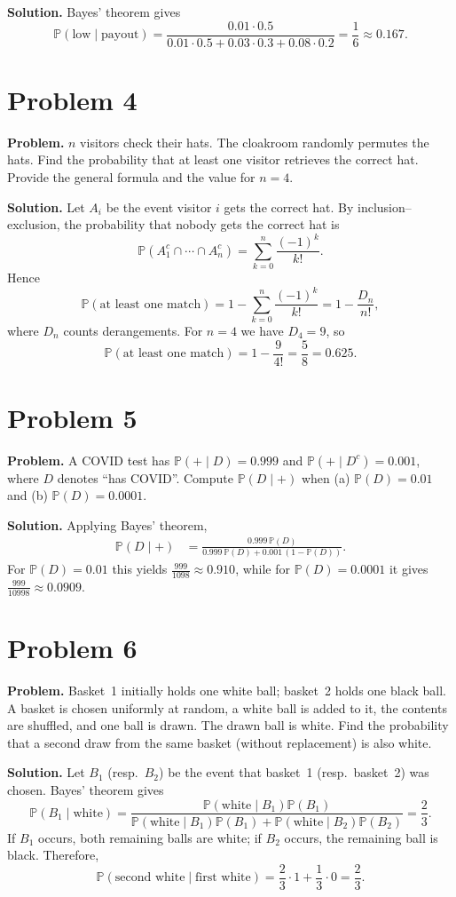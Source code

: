 \documentclass{article}
\begin{document}
\textbf{Solution.} Bayes' theorem gives
\[
\mathbb{P}(\text{low}\mid \text{payout}) = \frac{0.01\cdot 0.5}{0.01\cdot 0.5 + 0.03\cdot 0.3 + 0.08\cdot 0.2} = \frac{1}{6} \approx 0.167.
\]

\section{Problem 4}

\textbf{Problem.} $n$ visitors check their hats. The cloakroom randomly permutes the hats. Find the probability that at least one visitor retrieves the correct hat. Provide the general formula and the value for $n=4$.

\textbf{Solution.} Let $A_i$ be the event visitor $i$ gets the correct hat. By inclusion--exclusion, the probability that nobody gets the correct hat is
\[
\mathbb{P}(A_1^c\cap \cdots \cap A_n^c) = \sum_{k=0}^{n} \frac{(-1)^k}{k!}.
\]
Hence
\[
\mathbb{P}(\text{at least one match}) = 1 - \sum_{k=0}^{n} \frac{(-1)^k}{k!} = 1 - \frac{D_n}{n!},
\]
where $D_n$ counts derangements. For $n=4$ we have $D_4=9$, so
\[
\mathbb{P}(\text{at least one match}) = 1 - \frac{9}{4!} = \frac{5}{8} = 0.625.
\]

\section{Problem 5}

\textbf{Problem.} A COVID test has $\mathbb{P}(+\mid D)=0.999$ and $\mathbb{P}(+\mid D^c)=0.001$, where $D$ denotes ``has COVID''. Compute $\mathbb{P}(D\mid +)$ when (a) $\mathbb{P}(D)=0.01$ and (b) $\mathbb{P}(D)=0.0001$.

\textbf{Solution.} Applying Bayes' theorem,
\begin{align*}
\mathbb{P}(D\mid +) &= \frac{0.999\,\mathbb{P}(D)}{0.999\,\mathbb{P}(D) + 0.001\,(1-\mathbb{P}(D))}.
\end{align*}
For $\mathbb{P}(D)=0.01$ this yields $\frac{999}{1098}\approx 0.910$, while for $\mathbb{P}(D)=0.0001$ it gives $\frac{999}{10998}\approx 0.0909$.

\section{Problem 6}

\textbf{Problem.} Basket~1 initially holds one white ball; basket~2 holds one black ball. A basket is chosen uniformly at random, a white ball is added to it, the contents are shuffled, and one ball is drawn. The drawn ball is white. Find the probability that a second draw from the same basket (without replacement) is also white.

\textbf{Solution.} Let $B_1$ (resp.\ $B_2$) be the event that basket~1 (resp.\ basket~2) was chosen. Bayes' theorem gives
\[
\mathbb{P}(B_1\mid \text{white}) = \frac{\mathbb{P}(\text{white}\mid B_1)\mathbb{P}(B_1)}{\mathbb{P}(\text{white}\mid B_1)\mathbb{P}(B_1) + \mathbb{P}(\text{white}\mid B_2)\mathbb{P}(B_2)} = \frac{2}{3}.
\]
If $B_1$ occurs, both remaining balls are white; if $B_2$ occurs, the remaining ball is black. Therefore,
\[
\mathbb{P}(\text{second white}\mid \text{first white}) = \frac{2}{3}\cdot 1 + \frac{1}{3}\cdot 0 = \frac{2}{3}.
\]
\end{document}
